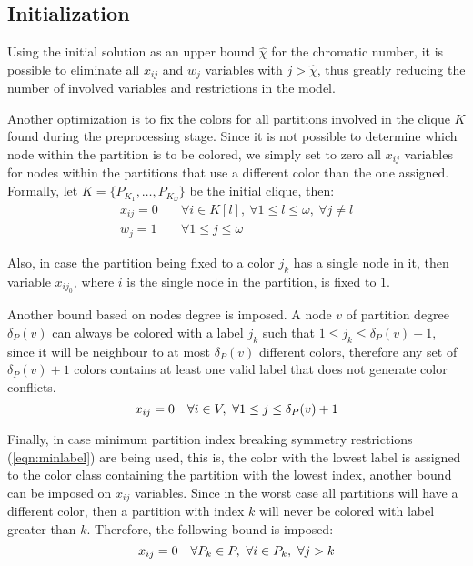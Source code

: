 \subsection{Initialization}

Using the initial solution as an upper bound $\hat{\chi}$ for the chromatic number, it is possible to eliminate all $x_{ij}$ and $w_j$ variables with $j > \hat{\chi}$, thus greatly reducing the number of involved variables and restrictions in the model.

Another optimization is to fix the colors for all partitions involved in the clique $K$ found during the preprocessing stage. Since it is not possible to determine which node within the partition is to be colored, we simply set to zero all $x_{ij}$ variables for nodes within the partitions that use a different color than the one assigned. Formally, let $K = \{ P_{K_1}, \ldots, P_{K_\omega} \}$ be the initial clique, then:
\begin{align*}
x_{ij} = 0 \quad &\forall i \in K[l],\ \forall 1 \leq l \leq \omega,\ \forall j \neq l \\
w_j = 1 \quad &\forall 1 \leq j \leq \omega
\end{align*}

Also, in case the partition being fixed to a color $j_k$ has a single node in it, then variable $x_{ij_0}$, where $i$ is the single node in the partition, is fixed to $1$.

Another bound based on nodes degree is imposed. A node $v$ of partition degree $\delta_P(v)$ can always be colored with a label $j_k$ such that $1 \leq j_k \leq \delta_P(v) + 1$, since it will be neighbour to at most $\delta_P(v)$ different colors, therefore any set of $\delta_P(v) + 1$ colors contains at least one valid label that does not generate color conflicts.  
\begin{equation*}
x_{ij} = 0 \quad \forall i \in V,\ \forall 1 \leq j \leq \delta_P(v) + 1 \\
\end{equation*}

Finally, in case minimum partition index breaking symmetry restrictions (\ref{eqn:minlabel}) are being used, this is, the color with the lowest label is assigned to the color class containing the partition with the lowest index, another bound can be imposed on $x_{ij}$ variables. Since in the worst case all partitions will have a different color, then a partition with index $k$ will never be colored with label greater than $k$. Therefore, the following bound is imposed:
\begin{equation*}
x_{ij} = 0 \quad \forall P_k \in P,\ \forall i \in P_k,\ \forall j > k \\
\end{equation*}

